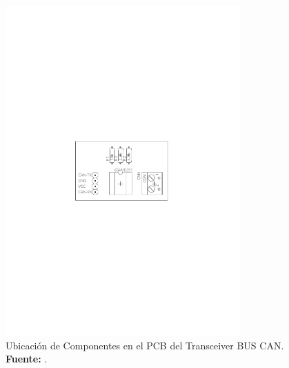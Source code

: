 



\begin{figure}[H]
	\centering
		\includegraphics[trim = 5mm 60mm 5mm 60mm, clip, width=0.8\textwidth]{./Cap4imagen/transGraf1.pdf}
	\caption[Ubicación de Componentes en el PCB del Transceiver BUS CAN.]{Ubicación de Componentes en el PCB del Transceiver BUS CAN.\textbf{ Fuente:} \cite{DaP}.}
	\label{Esch8} %
\end{figure}



